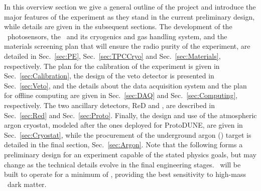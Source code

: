 In this overview section we give a general outline of the project and introduce the major features of the experiment as they stand in the current preliminary design, while details are given in the subsequent sections. The development of the \SiPM\ photosensors, the \LArTPC\ and its cryogenics and gas handling system, and the materials screening plan that will ensure the radio purity of the experiment, are detailed in Sec.~\ref{sec:PE}, Sec.~\ref{sec:TPCCryo} and Sec.~\ref{sec:Materials}, respectively.  The plan for the calibration of the experiment is given in Sec.~\ref{sec:Calibration}, the design of the veto detector is presented in Sec.~\ref{sec:Veto}, and the details about the data acquisition system and the plan for offline computing are given in Sec.~\ref{sec:DAQ} and Sec.~\ref{sec:Computing}, respectively.  The two ancillary detectors, ReD and \DSp, are described in Sec.~\ref{sec:Red} and Sec.~\ref{sec:Proto}.  Finally, the design and use of the atmospheric argon cryostat, modeled after the ones deployed for ProtoDUNE, are given in Sec.~\ref{sec:Cryostat}, while the procurement of the underground argon (\UAr) target is detailed in the final section, Sec.~\ref{sec:Argon}.  Note that the following forms a preliminary design for an experiment capable of the stated physics goals, but may change as the technical details evolve in the final engineering stages.  \DSks\ will be built to operate for a minimum of \DSkExtendedRunTimePlanned, providing the best sensitivity to high-mass \WIMP\ dark matter.

